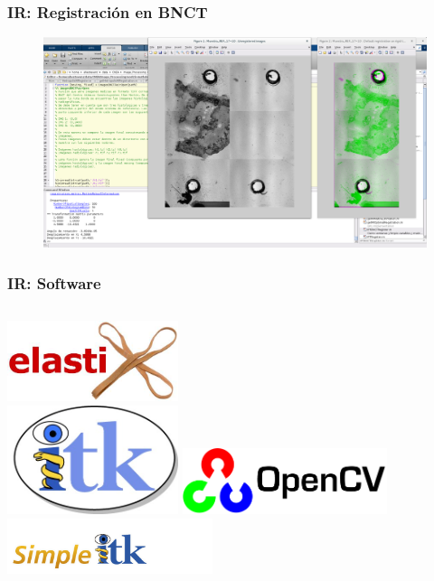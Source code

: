 \documentclass{beamer} %
\begin{document}
\begin{frame}
\end{frame}

\begin{frame}
\frametitle{IR: Registración en BNCT}

\begin{figure}
  \includegraphics[width=\textwidth]{images/IPTBNCTRegister.png}
\end{figure}

\end{frame}

\begin{frame}
\frametitle{IR: Software}

\begin{columns}[t]
\pause
\centering
\includegraphics[width=5cm]{images/logos/elastix.png}\\
\pause
\includegraphics[width=5cm]{images/logos/itkLogo.jpg}
\pause
\centering
\includegraphics[width=6cm]{images/logos/opencv.png}\\
\pause
\includegraphics[width=6cm]{images/logos/simpleitk.png}
\end{columns}

\end{frame}
\end{document}
